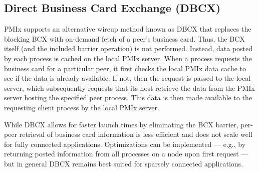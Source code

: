 
\subsection{Direct Business Card Exchange (DBCX)}

\ac{PMIx} supports an alternative wireup method known as \ac{DBCX} that replaces the blocking \ac{BCX} with on-demand fetch of a peer’s business card. Thus, the \ac{BCX} itself (and the included barrier operation) is not performed. Instead, data posted by each process is cached on the local \ac{PMIx} server. When a process requests the business card for a particular peer, it first checks the local \ac{PMIx} data cache to see if the data is already available. If not, then the request is passed to the local server, which subsequently requests that its host retrieve the data from the \ac{PMIx} server hosting the specified peer process. This data is then made available to the requesting client process by the local \ac{PMIx} server.

While \ac{DBCX} allows for faster launch times by eliminating the \ac{BCX} barrier, per-peer retrieval of business card information is less efficient and does not scale well for fully connected applications. Optimizations can be implemented — e.g., by returning posted information from all processes on a node upon first request — but in general \ac{DBCX} remains best suited for sparsely connected applications.

